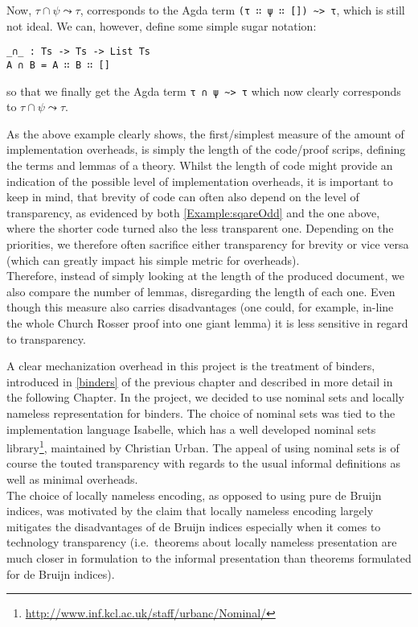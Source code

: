 \documentclass[a4paper, 12pt, twoside]{style/ociamthesis}
\theoremstyle{plain}
\theoremstyle{definition}
\newtheorem{Example}{Example}[chapter]
\theoremstyle{remark}
\newtheorem*{Remark}{Remark}
\renewcommand{\href}[2]{#2\footnote{\url{#1}}}
\renewenvironment{Example}{\begin{OldExample}\begin{mdframed}[style=example, linecolor=yellow]}{\end{mdframed}\end{OldExample}}
\renewenvironment{Remark}{\begin{OldRemark}\begin{mdframed}[style=example, linecolor=black]}{\end{mdframed}\end{OldRemark}}
\begin{document}
\begin{Example}
\begin{Remark}
\end{Remark}

Now, \(\tau \cap \psi \leadsto \tau\), corresponds to the Agda term
\texttt{(τ ∷ ψ ∷ [])  \textasciitilde > τ}, which is still not ideal. We
can, however, define some simple sugar notation:

\begin{verbatim}
_∩_ : Ts -> Ts -> List Ts
A ∩ B = A ∷ B ∷ []
\end{verbatim}

so that we finally get the Agda term \texttt{τ ∩ ψ \textasciitilde > τ}
which now clearly corresponds to \(\tau \cap \psi \leadsto \tau\).

\end{Example}

As the above example clearly shows, the first/simplest measure of the
amount of implementation overheads, is simply the length of the
code/proof scrips, defining the terms and lemmas of a theory. Whilst the
length of code might provide an indication of the possible level of
implementation overheads, it is important to keep in mind, that brevity
of code can often also depend on the level of transparency, as evidenced
by both \cref{Example:sqareOdd} and the one above, where the shorter
code turned also the less transparent one. Depending on the priorities,
we therefore often sacrifice either transparency for brevity or vice
versa (which can greatly impact his simple metric for overheads).\\
Therefore, instead of simply looking at the length of the produced
document, we also compare the number of lemmas, disregarding the length
of each one. Even though this measure also carries disadvantages (one
could, for example, in-line the whole Church Rosser proof into one giant
lemma) it is less sensitive in regard to transparency.

A clear mechanization overhead in this project is the treatment of
binders, introduced in \cref{binders} of the previous chapter and
described in more detail in the following Chapter. In the project, we
decided to use nominal sets and locally nameless representation for
binders. The choice of nominal sets was tied to the implementation
language Isabelle, which has a well developed
\href{http://www.inf.kcl.ac.uk/staff/urbanc/Nominal/}{nominal sets
library}, maintained by Christian Urban. The appeal of using nominal
sets is of course the touted transparency with regards to the usual
informal definitions as well as minimal overheads.\\
The choice of locally nameless encoding, as opposed to using pure de
Bruijn indices, was motivated by the claim that locally nameless
encoding largely mitigates the disadvantages of de Bruijn indices
especially when it comes to technology transparency (i.e.~theorems about
locally nameless presentation are much closer in formulation to the
informal presentation than theorems formulated for de Bruijn indices).
\end{document}
